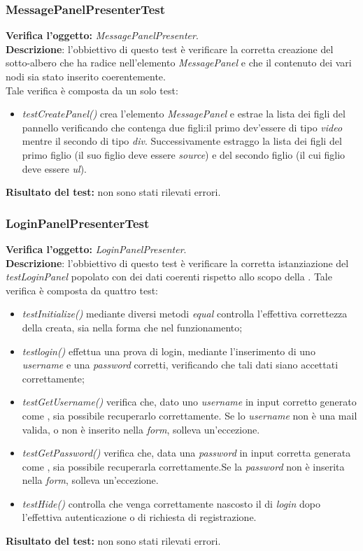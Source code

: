 \subsubsection{MessagePanelPresenterTest}
\textbf{Verifica l'oggetto:} \textit{MessagePanelPresenter}.\\
\textbf{Descrizione}: l'obbiettivo di questo test è verificare la corretta creazione del sotto-albero che ha radice nell'elemento \textit{MessagePanel} e che il contenuto dei vari nodi sia stato inserito coerentemente.\\
Tale verifica è composta da un solo test:
\begin{itemize}
\item \textit{testCreatePanel()} crea l'elemento \textit{MessagePanel} e estrae la lista dei figli del pannello verificando che contenga due figli:il primo dev'essere di tipo \textit{video} mentre il secondo di tipo \textit{div}.
Successivamente estraggo la lista dei figli del primo figlio (il suo figlio deve essere \textit{source}) e del secondo figlio (il cui figlio deve essere \textit{ul}).
\end{itemize}
\textbf{Risultato del test:} non sono stati rilevati errori.


\subsubsection{LoginPanelPresenterTest}
\textbf{Verifica l'oggetto:} \textit{LoginPanelPresenter}.\\
\textbf{Descrizione}: l'obbiettivo di questo test è verificare la corretta istanziazione del \textit{testLoginPanel} popolato con dei dati coerenti rispetto allo scopo della .
Tale verifica è composta da quattro test:
\begin{itemize} 
\item \textit{testInitialize() } mediante diversi metodi \textit{equal} controlla l'effettiva correttezza della  creata, sia nella forma che nel funzionamento;
\item \textit{testlogin() } effettua una prova di login, mediante l'inserimento di uno \textit{username} e una \textit{password} corretti, verificando che tali dati siano accettati correttamente;
\item \textit{testGetUsername() } verifica che, dato uno \textit{username} in input corretto generato come , sia possibile recuperarlo correttamente. Se lo \textit{username} non è una mail valida, o non è inserito nella \textit{form}, solleva un'eccezione.
\item \textit{testGetPassword() } verifica che, data una \textit{password} in input corretta generata come , sia possibile recuperarla correttamente.Se la \textit{password} non è inserita nella \textit{form}, solleva un'eccezione.
\item \textit{testHide()} controlla che venga correttamente nascosto il  di \textit{login} dopo l'effettiva autenticazione o di richiesta di registrazione.
\end{itemize}
\textbf{Risultato del test:} non sono stati rilevati errori.



